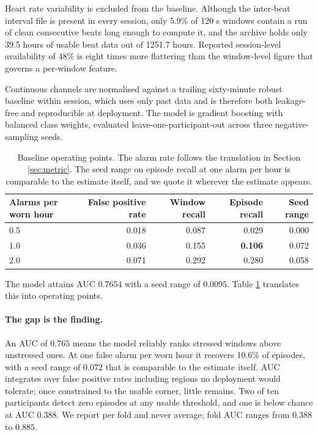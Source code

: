 \documentclass{article}
\begin{document}
Heart rate variability is excluded from the baseline. Although the inter-beat
interval file is present in every session, only 5.9\% of
120 s windows contain a run of clean consecutive beats long enough
to compute it, and the archive holds only 39.5 hours of usable beat data
out of 1251.7 hours. Reported session-level availability of
48\% is eight times more flattering than the window-level figure
that governs a per-window feature.

Continuous channels are normalised against a trailing sixty-minute robust
baseline within session, which uses only past data and is therefore both
leakage-free and reproducible at deployment. The model is gradient boosting
with balanced class weights, evaluated leave-one-participant-out across three
negative-sampling seeds.

\begin{table}[t]
\caption{Baseline operating points. The alarm rate follows the translation in
Section \ref{sec:metric}. The seed range on episode recall at one alarm per
hour is comparable to the estimate itself, and we quote it wherever the
estimate appears.}
\label{tab:baseline}
\centering
\begin{tabular}{lrrrr}
\toprule
Alarms per worn hour & False positive rate & Window recall &
Episode recall & Seed range \\
\midrule
0.5 & 0.018 & 0.087 & 0.029 & 0.000 \\
1.0 & 0.036 & 0.155 & \textbf{0.106} & 0.072 \\
2.0 & 0.071 & 0.292 & 0.280 & 0.058 \\
\bottomrule
\end{tabular}
\end{table}

The model attains AUC $0.7654$ with a seed range of $0.0095$. Table
\ref{tab:baseline} translates this into operating points.

\paragraph{The gap is the finding.} An AUC of $0.765$ means the model reliably
ranks stressed windows above unstressed ones. At one false alarm per worn hour
it recovers 10.6\% of episodes, with a seed range of $0.072$ that
is comparable to the estimate itself. AUC integrates over false positive rates
including regions no deployment would tolerate; once constrained to the usable
corner, little remains. Two of ten participants detect zero episodes at any
usable threshold, and one is below chance at AUC $0.388$. We report per fold
and never average; fold AUC ranges from $0.388$ to $0.885$.
\end{document}
